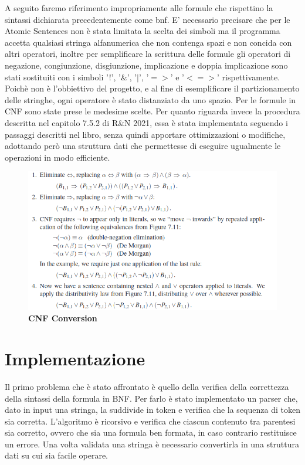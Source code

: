 \documentclass{article} %
\begin{document}
A seguito faremo riferimento impropriamente alle formule che rispettino la sintassi dichiarata precedentemente come bnf.
E' necessario precisare che per le Atomic Sentences non è stata limitata la scelta dei simboli ma il programma accetta qualsiasi stringa alfanumerica che non contenga spazi e non concida con altri operatori, inoltre per semplificare la scrittura delle formule gli operatori di negazione, congiunzione, disgiunzione, implicazione e doppia implicazione sono stati sostituiti con i simboli '!', '\&', '$|$', '$=>$' e '$<=>$' rispettivamente.
Poichè non è l'obbiettivo del progetto, e al fine di esemplificare il partizionamento delle stringhe, ogni operatore è stato distanziato da uno spazio.
Per le formule in CNF sono state prese le medesime scelte. 
Per quanto riguarda invece la procedura descritta nel capitolo 7.5.2 di R\&N 2021, essa è stata implementata seguendo i passaggi descritti nel libro, senza quindi apportare ottimizzazioni o modifiche, adottando però una struttura dati che permettesse di eseguire ugualmente le operazioni in modo efficiente.

\begin{figure}[htbp]
    \caption{\textbf{CNF Conversion}}
    \centering
    \includegraphics[width=\linewidth]{cnf}
\end{figure}


\section*{Implementazione}  

Il primo problema che è stato affrontato è quello della verifica della correttezza della sintassi della formula in BNF. Per farlo è stato implementato un parser che, dato in input una stringa, la suddivide in token e verifica che la sequenza di token sia corretta.
L'algoritmo è ricorsivo e verifica che ciascun contenuto tra parentesi sia corretto, ovvero che sia una formula ben formata, in caso contrario restituisce un errore.
Una volta validata una stringa è necessario convertirla in una struttura dati su cui sia facile operare. 
\end{document}
